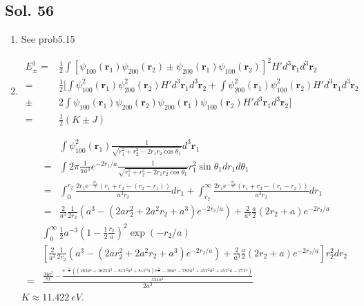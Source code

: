 \subsection*{Sol. 56}
\begin{enumerate}
    \item See prob5.15
    \item 
    \begin{align*}
        E^1_{\pm}=&
        \frac{1}{2}\int
        [\psi_{100}(\bm r_1)\psi_{200}(\bm r_2)\pm 
        \psi_{200}(\bm r_1)\psi_{100}(\bm r_2)
        ]^2H'd^3\bm r_1d^3\bm r_2\\
        =&
        \frac{1}{2}\bigg[
        \int
        \psi^2_{100}(\bm r_1)\psi^2_{200}(\bm r_2)H'd^3\bm r_1d^3\bm r_2
        +
        \int
        \psi^2_{200}(\bm r_1)\psi^2_{100}(\bm r_2)H'd^3\bm r_1d^3\bm r_2\\
        \pm&2\int
        \psi_{100}(\bm r_1)\psi_{200}(\bm r_2)
        \psi_{200}(\bm r_1)\psi_{100}(\bm r_2)
        H'd^3\bm r_1d^3\bm r_2
        \bigg]\\
        =&\frac{1}{2}(K\pm J)
    \end{align*}

    \begin{align*}
        &\int\psi_{100}^2(\bm r_1)\frac{1}{\sqrt{r_1^2+r_2^2-2r_1r_2\cos\theta_1}}d^3\bm r_1\\
        =&
        \int
        2\pi
        \frac{1}{\pi a^3}e^{-2r_1/a}\frac{1}{\sqrt{r_1^2+r_2^2-2r_1r_2\cos\theta_1}}r_1^2\sin\theta_1 dr_1d\theta_1\\
        =&
        \int_0^{r_2}\frac{2r_{1} \mathrm{e}^{-\frac{2r_{1}}{a}} \left(r_1+r_2-(r_2-r_1)\right)}{a^{3} r_{2}}dr_1
        +
        \int_{r_2}^{\infty}\frac{2r_{1} \mathrm{e}^{-\frac{2r_{1}}{a}} \left(r_1+r_2-(r_1-r_2)\right)}{a^{3} r_{2}}dr_1\\
        =&
        \frac{2}{a^3}
        \frac{1}{2r_2}
        \left(
        a^3
        -
        (2ar_2^2+2a^2r_2+a^3)e^{-2r_2/a}
        \right)
        +\frac{2}{a^3}
        \frac{a}{2}(2r_2+a)e^{-2r_2/a}
    \end{align*}
    \begin{align*}
        &\int_0^\infty
        \frac{1}{2}a^{-3}
        \left(1-\frac{1}{2}\frac{r_2}{a}\right)^2
        \exp(-r_2/a)\\
        &
        \left[
        \frac{2}{a^3}
        \frac{1}{2r_2}
        \left(
        a^3
        -
        (2ar_2^2+2a^2r_2+a^3)e^{-2r_2/a}
        \right)
        +\frac{2}{a^3}
        \frac{a}{2}(2r_2+a)e^{-2r_2/a}
        \right]r_2^2dr_2\\
        =&
        \frac{\frac{34a^{2}}{81} - \frac{\mathrm{e}^{-\frac{3\pi}{a}} \left(\left(162a^{4} + 162\pi a^{3} - 81\pi^{2} a^{2} + 81\pi^{3} a\right) \mathrm{e}^{\frac{2\pi}{a}} - 26a^{4} - 78\pi a^{3} + 45\pi^{2} a^{2} + 45\pi^{3} a - 27\pi^{4}\right)}{324a^{2}}}{2a^{3}}
    \end{align*}
    $K\approx \qty{11.422}{eV}.$


\end{enumerate}
